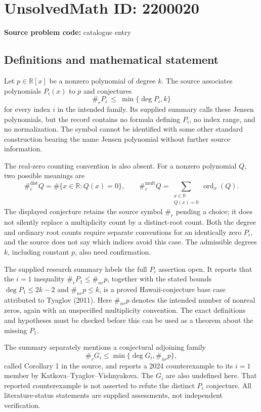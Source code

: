 \documentclass[11pt]{article}
\newcommand{\Q}{\mathbb{Q}}
\newcommand{\R}{\mathbb{R}}
\begin{document}
\section*{UnsolvedMath ID: 2200020}
\textbf{Source problem code:} catalogue entry
\subsection{Definitions and mathematical statement}
Let $p\in\R[x]$ be a nonzero polynomial of degree $k$. The source associates polynomials $P_i(x)$ to $p$ and conjectures
\[
\#_r P_i\ \le\ \min\{\deg P_i,k\}
\]
for every index $i$ in the intended family. Its supplied summary calls these Jensen polynomials, but the record contains no formula defining $P_i$, no index range, and no normalization. The symbol cannot be identified with some other standard construction bearing the name Jensen polynomial without further source information.

The real-zero counting convention is also absent. For a nonzero polynomial $Q$, two possible meanings are
\[
\#_r^{\mathrm{dist}}Q=\#\{x\in\R:Q(x)=0\},\qquad
\#_r^{\mathrm{mult}}Q=\sum_{\substack{x\in\R\\Q(x)=0}}\operatorname{ord}_x(Q).
\]
The displayed conjecture retains the source symbol $\#_r$ pending a choice; it does not silently replace a multiplicity count by a distinct-root count. Both the degree and ordinary root counts require separate conventions for an identically zero $P_i$, and the source does not say which indices avoid this case. The admissible degrees $k$, including constant $p$, also need confirmation.

The supplied research summary labels the full $P_i$ assertion open. It reports that the $i=1$ inequality $\#_rP_1\le\#_{nr}p$, together with the stated bounds $\deg P_1\le2k-2$ and $\#_{nr}p\le k$, is a proved Hawaii-conjecture base case attributed to Tyaglov (2011). Here $\#_{nr}p$ denotes the intended number of nonreal zeros, again with an unspecified multiplicity convention. The exact definitions and hypotheses must be checked before this can be used as a theorem about the missing $P_1$.

The summary separately mentions a conjectural adjoining family
\[
\#_rG_i\le\min\{\deg G_i,\#_{nr}p\},
\]
called Corollary 1 in the source, and reports a 2024 counterexample to its $i=1$ member by Katkova--Tyaglov--Vishnyakova. The $G_i$ are also undefined here. That reported counterexample is not asserted to refute the distinct $P_i$ conjecture. All literature-status statements are supplied assessments, not independent verification.
\end{document}
